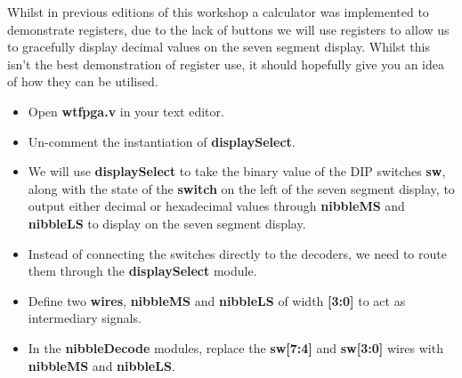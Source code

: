 \documentclass[12pt,a4paper]{article}
\begin{document}
\noindent
Whilst in previous editions of this workshop a calculator was implemented to demonstrate registers, due to the lack of buttons we will use registers to allow us to gracefully display decimal values on the seven segment display. Whilst this isn't the best demonstration of register use, it should hopefully give you an idea of how they can be utilised.

\begin{itemize}
	\item Open \textbf{wtfpga.v} in your text editor. 
	\item Un-comment the instantiation of \textbf{displaySelect}.
	\item We will use \textbf{displaySelect} to take the binary value of the DIP switches \textbf{sw}, along with the state of the \textbf{switch} on the left of the seven segment display, to output either decimal or hexadecimal values through \textbf{nibbleMS} and \textbf{nibbleLS} to display on the seven segment display. 
	\item Instead of connecting the switches directly to the decoders, we need to route them through the \textbf{displaySelect} module. 
	\item Define two \textbf{wires}, \textbf{nibbleMS} and \textbf{nibbleLS} of width \textbf{[3:0]} to act as intermediary signals.
	\item In the \textbf{nibbleDecode} modules, replace the \textbf{sw[7:4]} and \textbf{sw[3:0]} wires with \textbf{nibbleMS} and \textbf{nibbleLS}.	
\end{itemize} 
\end{document}
